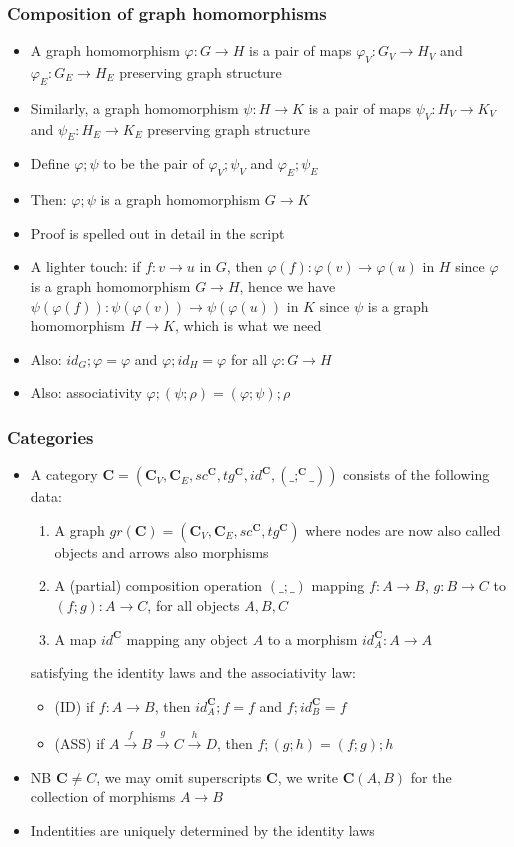 \documentclass[handout]{beamer}
\newcommand{\bfsf}[1]{{\boldsymbol{#1}}}
\newcommand{\CC}{\bfsf{C}}
\begin{document}
\frame
  {   
    \frametitle{Composition of graph homomorphisms}\label{Ch2:Ghom-comp}

 \begin{itemize}[<+->]
\item A graph homomorphism $\varphi: G\to H$ is a pair of maps
$\varphi_V : G_V \to H_V$ and $\varphi_E : G_E \to H_E$ preserving graph structure 
\item Similarly, a graph homomorphism $\psi: H\to K$ is a pair of maps
$\psi_V : H_V \to K_V$ and $\psi_E : H_E \to K_E$ preserving graph structure
\item Define $\varphi;\psi$ to be the pair of $\varphi_V;\psi_V$ and $\varphi_E;\psi_E$
\item Then: $\varphi;\psi$ is a graph homomorphism $G\to K$
\item Proof is spelled out in detail in the script
\item A lighter touch: if $f: v\to u$ in $G$, 
then $\varphi(f): \varphi(v)\to \varphi(u)$ in $H$
since $\varphi$ is a graph homomorphism $G\to H$, 
hence we have $\psi(\varphi(f)): \psi(\varphi(v))\to \psi(\varphi(u))$ in $K$
since $\psi$ is a graph homomorphism $H\to K$, 
which is what we need 
\item Also: $id_G ; \varphi = \varphi$ and $\varphi; id_H = \varphi$ for all $\varphi:G\to H$
 \item Also: associativity $\varphi;(\psi;\rho) = (\varphi;\psi);\rho$
 \end{itemize}

 }


\frame
  {   
    \frametitle{Categories}\label{Ch2:categories}

 \begin{itemize}[<+->]
\item A category $\CC = (\CC_V,\CC_E,sc^\CC, tg^\CC, id^\CC,(\_;^\CC\_))$ consists of the following data:
   \begin{enumerate}[<+->]
\item A graph $gr(\CC) =  (\CC_V,\CC_E,sc^\CC, tg^\CC)$ where nodes are now also called objects
and arrows also morphisms
\item A (partial) composition operation $(\_;\_)$ mapping $f: A\to B$, $g: B\to C$
to $(f;g): A\to C$, for all objects $A,B,C$
\item A map $id^\CC$ mapping any object $A$ to a morphism $id^\CC_A: A\to A$
   \end{enumerate}
satisfying the identity laws and the associativity law:
   \begin{itemize}[<+->]
\item(ID) if $f: A\to B$, then $id^\CC_A;f = f$ and  $f;id^\CC_B = f$
\item(ASS) if $A \stackrel{f}{\to} B \stackrel{g}{\to} C \stackrel{h}{\to}D $, then $f;(g;h)=(f;g);h$
   \end{itemize}
\item NB $\CC \neq C$, we may omit superscripts $\CC$,
we write $\CC(A,B)$ for the collection of morphisms $A\to B$
\item Indentities are uniquely determined by the identity laws
 \end{itemize}

 }
\end{document}
